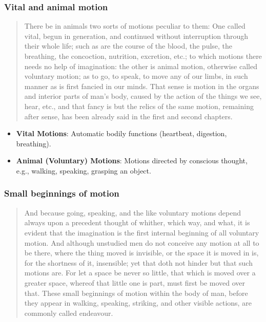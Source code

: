         \subsubsection{Vital and animal motion}

            \begin{quote}
                There be in animals two sorts of motions peculiar to them: One called vital, begun in generation, and continued without interruption through their whole life; such as are the course of the blood, the pulse, the breathing, the concoction, nutrition, excretion, etc.; to which motions there needs no help of imagination: the other is animal motion, otherwise called voluntary motion; as to go, to speak, to move any of our limbs, in such manner as is first fancied in our minds. That sense is motion in the organs and interior parts of man’s body, caused by the action of the things we see, hear, etc., and that fancy is but the relics of the same motion, remaining after sense, has been already said in the first and second chapters.
            \end{quote} 

            \begin{itemize}
                \item \textbf{Vital Motions}: Automatic bodily functions (heartbeat, digestion, breathing).
                \item \textbf{Animal (Voluntary) Motions}: Motions directed by conscious thought, e.g., walking, speaking, grasping an object.
            \end{itemize}

        \subsubsection{Small beginnings of motion}

            \begin{quote}
                And because going, speaking, and the like voluntary motions depend always upon a precedent thought of whither, which way, and what, it is evident that the imagination is the first internal beginning of all voluntary motion. And although unstudied men do not conceive any motion at all to be there, where the thing moved is invisible, or the space it is moved in is, for the shortness of it, insensible; yet that doth not hinder but that such motions are. For let a space be never so little, that which is moved over a greater space, whereof that little one is part, must first be moved over that. These small beginnings of motion within the body of man, before they appear in walking, speaking, striking, and other visible actions, are commonly called endeavour.
            \end{quote}

